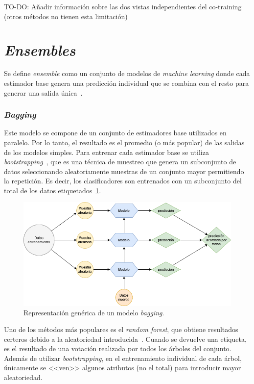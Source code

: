 TO-DO: Añadir información sobre las dos vistas independientes del co-training (otros métodos no tienen esta limitación)


\section{\textit{Ensembles}}

Se define \textit{ensemble} como un conjunto de modelos de \textit{machine learning} donde cada estimador base genera una predicción individual que se combina con el resto para generar una salida única~\cite{originalCoForest2007}.
	
\subsubsection{\textit{Bagging}}

Este modelo se compone de un conjunto de estimadores base utilizados en paralelo. Por lo tanto, el resultado es el promedio (o más popular) de las salidas de los modelos simples. Para entrenar cada estimador base se utiliza \textit{bootstrapping}~\cite{engelen2018thesis}, que es una técnica de muestreo que genera un subconjunto de datos seleccionando aleatoriamente muestras de un conjunto mayor permitiendo la repetición. Es decir, los clasificadores son entrenados con un subconjunto del total de los datos etiquetados~\ref{img:bagging}.

\begin{figure}[h]
	\caption{Representación genérica de un modelo \textit{bagging}.}
	\label{img:bagging}
	\centering
	\includegraphics[width=\textwidth]{../img/memoria/bagging}
\end{figure}
	
Uno de los métodos más populares es el \textit{random forest}, que obtiene resultados certeros debido a la aleatoriedad introducida~\cite{originalCoForest2007}. Cuando se devuelve una etiqueta, es el resultado de una votación realizada por todos los árboles del conjunto. Además de utilizar \textit{bootstrapping}, en el entrenamiento individual de cada árbol, únicamente se <<ven>> algunos atributos (no el total) para introducir mayor aleatoriedad.
	
